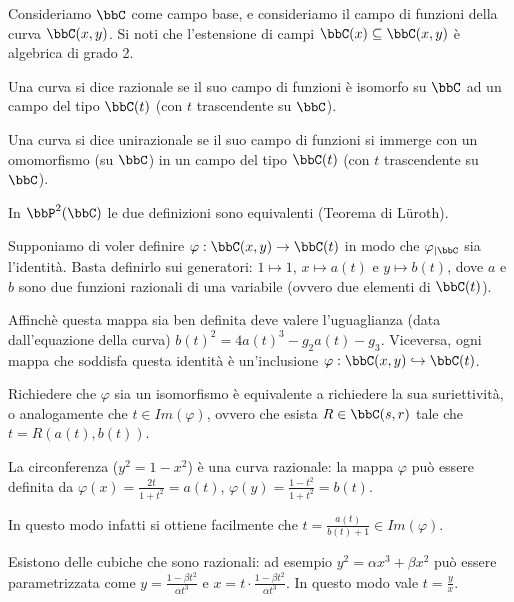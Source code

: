 Consideriamo $\bbC$ come campo base, e consideriamo il campo di funzioni della curva $\bbC(x,y)$. Si noti che l'estensione di campi $\bbC(x)\subseteq\bbC(x,y)$ è algebrica di grado 2.

\begin{definizione}
Una curva si dice razionale se il suo campo di funzioni è isomorfo su $\bbC$ ad un campo del tipo $\bbC(t)$ (con $t$ trascendente su $\bbC$).
\end{definizione}
\begin{definizione}
Una curva si dice unirazionale se il suo campo di funzioni si immerge con un omomorfismo (su $\bbC$) in un campo del tipo $\bbC(t)$ (con $t$ trascendente su $\bbC$).
\end{definizione}
\begin{osservazione}
In $\bbP^2(\bbC)$ le due definizioni sono equivalenti (Teorema di Lüroth).
\end{osservazione}
Supponiamo di voler definire $\varphi: \bbC(x,y) \rightarrow \bbC(t)$ in modo che $\varphi_{|\bbC}$ sia l'identità. Basta definirlo sui generatori: $1\mapsto 1$, $x\mapsto a(t)$ e $y\mapsto b(t)$, dove $a$ e $b$ sono due funzioni razionali di una variabile (ovvero due elementi di $\bbC(t)$).

Affinchè questa mappa sia ben definita deve valere l'uguaglianza (data dall'equazione della curva)   $b(t)^2=4a(t)^3-g_2a(t)-g_3$.
Viceversa, ogni mappa che soddisfa questa identità è un'inclusione $\varphi: \bbC(x,y) \hookrightarrow \bbC(t)$.

Richiedere che $\varphi$ sia un isomorfismo è equivalente a richiedere la sua suriettività, o analogamente che $t\in Im(\varphi)$, ovvero che esista $R\in \bbC(s,r)$ tale che $t=R(a(t),b(t))$.
\begin{osservazione}
La circonferenza ($y^2=1-x^2$) è una curva razionale: la mappa $\varphi$ può essere definita da $\varphi(x)=\frac{2t}{1+t^2}=a(t)$, $\varphi(y)=\frac{1-t^2}{1+t^2}=b(t)$.

In questo modo infatti si ottiene facilmente che $t=\frac{a(t)}{b(t)+1}\in Im(\varphi)$.
\end{osservazione}
\begin{osservazione}
Esistono delle cubiche che sono razionali: ad esempio $y^2=\alpha x^3 + \beta x^2$ può essere parametrizzata come $y=\frac{1-\beta t^2}{\alpha t^3}$ e $x=t\cdot\frac{1-\beta t^2}{\alpha t^3}$.
In questo modo vale $t=\frac{y}{x}$.
\end{osservazione}

